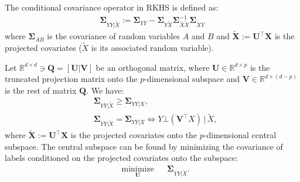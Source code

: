 \documentclass[lang=cn,10pt]{gorgeousnbook}
\numberwithin{equation}{section}%
\numberwithin{figure}{section}%
\begin{document}
\begin{definition}
The conditional covariance operator in RKHS is defined as:
\begin{align}
\boldsymbol{\Sigma}_{YY|\widetilde{X}} := \boldsymbol{\Sigma}_{YY} - \boldsymbol{\Sigma}_{Y\widetilde{X}} \boldsymbol{\Sigma}_{\widetilde{X}\widetilde{X}}^{-1} \boldsymbol{\Sigma}_{\widetilde{X}Y}
\end{align}
where $\boldsymbol{\Sigma}_{AB}$ is the covariance of random variables $A$ and $B$ and $\widetilde{\boldsymbol{X}} := \boldsymbol{U}^\top \boldsymbol{X}$ is the projected covariates ($\widetilde{X}$ is its associated random variable). 
\end{definition}

\begin{theorem}[]
Let $\mathbb{R}^{d \times d} \ni \boldsymbol{Q} = [\boldsymbol{U} | \boldsymbol{V}]$ be an orthogonal matrix, where $\boldsymbol{U} \in \mathbb{R}^{d \times p}$ is the truncated projection matrix onto the $p$-dimensional subspace and $\boldsymbol{V} \in \mathbb{R}^{d \times (d-p)}$ is the rest of matrix $\boldsymbol{Q}$.
We have:
\begin{align*}
&\boldsymbol{\Sigma}_{YY|\widetilde{X}} \geq \boldsymbol{\Sigma}_{YY|X}, \\
& \boldsymbol{\Sigma}_{YY|\widetilde{X}} = \boldsymbol{\Sigma}_{YY|X} \iff Y \bot (\boldsymbol{V}^\top X)\, |\, \widetilde{X},
\end{align*}
where $\widetilde{\boldsymbol{X}} := \boldsymbol{U}^\top \boldsymbol{X}$ is the projected covariates onto the $p$-dimensional central subspace.
The central subspace can be found by minimizing the covariance of labels conditioned on the projected covariates onto the subspace:
\begin{equation}\label{equation_KDR_optimization}
\begin{aligned}
& \underset{\boldsymbol{U}}{\text{minimize}} 
& & \boldsymbol{\Sigma}_{YY|\widetilde{X}}.
\end{aligned}
\end{equation}
\end{theorem}
\end{document}
